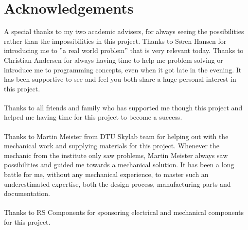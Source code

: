 \chapter{Acknowledgements}
A special thanks to my two academic advisers, for always seeing the possibilities rather than the impossibilities in this project. Thanks to Søren Hansen for introducing me to ''a real world problem'' that is very relevant today. Thanks to Christian Andersen for always having time to help me problem solving or introduce me to programming concepts, even when it got late in the evening. It has been supportive to see and feel you both share a huge personal interest in this project.\\ 
\\
Thanks to all friends and family who has supported me though this project and helped me having time for this project to become a success. \\ 
\\
Thanks to Martin Meister from DTU Skylab team for helping out with the mechanical work and supplying materials for this project. Whenever the mechanic from the institute only saw problems, Martin Meister always saw possibilities and guided me towards a mechanical solution. It has been a long battle for me, without any mechanical experience, to master such an underestimated expertise, both the design process, manufacturing parts and documentation. \\
\\
Thanks to RS Components for sponsoring electrical and mechanical components for this project. 